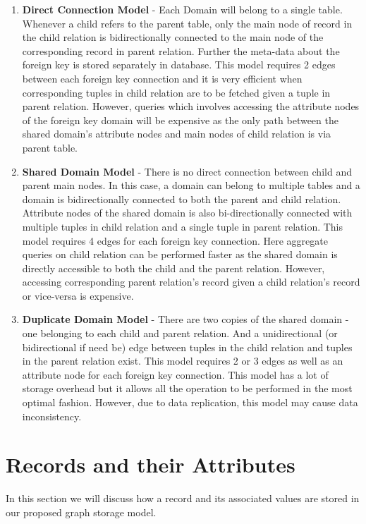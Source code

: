 \documentclass[12pt, oneside]{book}
\begin{document}
\begin{enumerate}
 \item \textbf{Direct Connection Model} - Each Domain will belong to a single table. Whenever a child refers to the parent table, only the main node of record in the child relation is bidirectionally connected to the main node of the corresponding record in parent relation. Further the meta-data about the foreign key is stored separately in database. This model requires 2 edges between each foreign key connection and it is very efficient when corresponding tuples in child relation are to be fetched given a tuple in parent relation. However, queries which involves accessing the attribute nodes of the foreign key domain will be expensive as the only path between the shared domain's attribute nodes and main nodes of child relation is via parent table.
 \item \textbf{Shared Domain Model} - There is no direct connection between child and parent main nodes. In this case, a domain can belong to multiple tables and a domain is bidirectionally connected to both the parent and child relation. Attribute nodes of the shared domain is also bi-directionally connected with multiple tuples in child relation and a single tuple in parent relation. This model requires 4 edges for each foreign key connection. Here aggregate queries on child relation can be performed faster as the shared domain is directly accessible to both the child and the parent relation. However, accessing corresponding parent relation's record given a child relation's record or vice-versa is expensive.
 \item \textbf{Duplicate Domain Model} - There are two copies of the shared domain - one belonging to each child and parent relation. And a unidirectional (or bidirectional if need be) edge between tuples in the child relation and tuples in the parent relation exist. This model requires 2 or 3 edges as well as an attribute node for each foreign key connection. This model has a lot of storage overhead but it allows all the operation to be performed in the most optimal fashion. However, due to data replication, this model may cause data inconsistency.
\end{enumerate}

\section{Records and their Attributes}
In this section we will discuss how a record and its associated values are stored in our proposed graph storage model.
\end{document}
